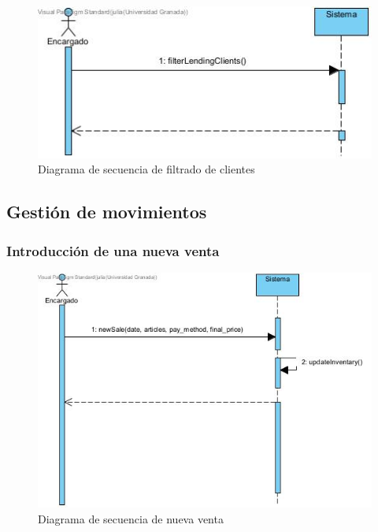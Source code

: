 \begin{figure}[H]
	\centering
	\includegraphics[width=1\textwidth]{imagenes/imagenesDiagramas/Cliente/filtrarClientes.jpg}
	\caption{Diagrama de secuencia de filtrado de clientes}
	\label{fig:seqdiag18}
\end{figure}

\subsection{Gestión de movimientos}

\subsubsection{Introducción de una nueva venta}

\begin{figure}[H]
	\centering
	\includegraphics[width=1\textwidth]{imagenes/imagenesDiagramas/Movimientos/nuevaVenta.jpg}
	\caption{Diagrama de secuencia de nueva venta}
	\label{fig:seqdiag19}
\end{figure}

